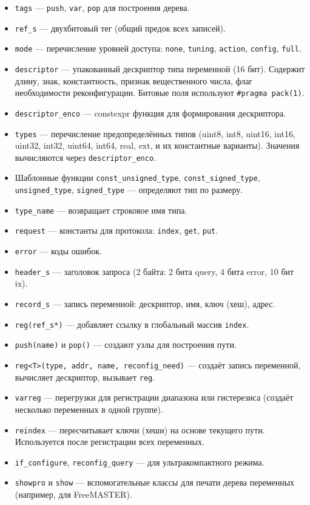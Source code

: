 \documentclass[a4paper,12pt]{article}
\begin{document}
\begin{itemize}
    \item \texttt{tags} — \texttt{push}, \texttt{var}, \texttt{pop} для построения дерева.
    \item \texttt{ref\_s} — двухбитовый тег (общий предок всех записей).
    \item \texttt{mode} — перечисление уровней доступа: \texttt{none}, \texttt{tuning}, \texttt{action}, \texttt{config}, \texttt{full}.
    \item \texttt{descriptor} — упакованный дескриптор типа переменной (16 бит). Содержит длину, знак, константность, признак вещественного числа, флаг необходимости реконфигурации. Битовые поля используют \texttt{\#pragma pack(1)}.
    \item \texttt{descriptor\_enco} — constexpr функция для формирования дескриптора.
    \item \texttt{types} — перечисление предопределённых типов (uint8, int8, uint16, int16, uint32, int32, uint64, int64, real, ext, и их константные варианты). Значения вычисляются через \texttt{descriptor\_enco}.
    \item Шаблонные функции \texttt{const\_unsigned\_type}, \texttt{const\_signed\_type}, \texttt{unsigned\_type}, \texttt{signed\_type} — определяют тип по размеру.
    \item \texttt{type\_name} — возвращает строковое имя типа.
    \item \texttt{request} — константы для протокола: \texttt{index}, \texttt{get}, \texttt{put}.
    \item \texttt{error} — коды ошибок.
    \item \texttt{header\_s} — заголовок запроса (2 байта: 2 бита query, 4 бита error, 10 бит ix).
    \item \texttt{record\_s} — запись переменной: дескриптор, имя, ключ (хеш), адрес.
    \item \texttt{reg(ref\_s*)} — добавляет ссылку в глобальный массив \texttt{index}.
    \item \texttt{push(name)} и \texttt{pop()} — создают узлы для построения пути.
    \item \texttt{reg<T>(type, addr, name, reconfig\_need)} — создаёт запись переменной, вычисляет дескриптор, вызывает \texttt{reg}.
    \item \texttt{varreg} — перегрузки для регистрации диапазона или гистерезиса (создаёт несколько переменных в одной группе).
    \item \texttt{reindex} — пересчитывает ключи (хеши) на основе текущего пути. Используется после регистрации всех переменных.
    \item \texttt{if\_configure}, \texttt{reconfig\_query} — для ультракомпактного режима.
    \item \texttt{showpro} и \texttt{show} — вспомогательные классы для печати дерева переменных (например, для FreeMASTER).
\end{itemize}
\end{document}
